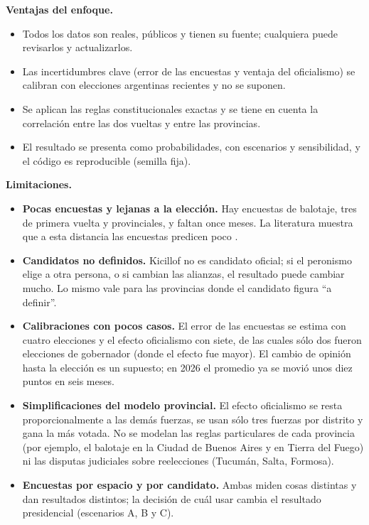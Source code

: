 \documentclass{article}
\begin{document}
\textbf{Ventajas del enfoque.}
\begin{itemize}
  \item Todos los datos son reales, públicos y tienen su fuente; cualquiera puede
        revisarlos y actualizarlos.
  \item Las incertidumbres clave (error de las encuestas y ventaja del
        oficialismo) se calibran con elecciones argentinas recientes y no se
        suponen.
  \item Se aplican las reglas constitucionales exactas y se tiene en cuenta la
        correlación entre las dos vueltas y entre las provincias.
  \item El resultado se presenta como probabilidades, con escenarios y
        sensibilidad, y el código es reproducible (semilla fija).
\end{itemize}

\textbf{Limitaciones.}
\begin{itemize}
  \item \textbf{Pocas encuestas y lejanas a la elección.} Hay \nEncBal{}
        encuestas de balotaje, tres de primera vuelta y \nEncProv{} provinciales,
        y faltan once meses. La literatura muestra que a esta distancia las
        encuestas predicen poco \cite{erikson2012,jennings2020}.
  \item \textbf{Candidatos no definidos.} Kicillof no es candidato oficial; si
        el peronismo elige a otra persona, o si cambian las alianzas, el
        resultado puede cambiar mucho. Lo mismo vale para las provincias donde
        el candidato figura ``a definir''.
  \item \textbf{Calibraciones con pocos casos.} El error de las encuestas se
        estima con cuatro elecciones y el efecto oficialismo con siete, de las
        cuales sólo dos fueron elecciones de gobernador (donde el efecto fue
        mayor). El cambio de opinión hasta la elección es un supuesto; en 2026 el
        promedio ya se movió unos diez puntos en seis meses.
  \item \textbf{Simplificaciones del modelo provincial.} El efecto oficialismo
        se resta proporcionalmente a las demás fuerzas, se usan sólo tres
        fuerzas por distrito y gana la más votada. No se modelan las reglas
        particulares de cada provincia (por ejemplo, el balotaje en la Ciudad de
        Buenos Aires y en Tierra del Fuego) ni las disputas judiciales sobre
        reelecciones (Tucumán, Salta, Formosa).
  \item \textbf{Encuestas por espacio y por candidato.} Ambas miden cosas
        distintas y dan resultados distintos; la decisión de cuál usar cambia el
        resultado presidencial (escenarios A, B y C).
\end{itemize}
\end{document}
